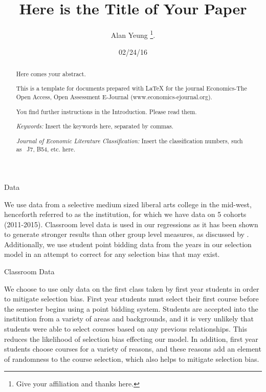 \documentclass[12pt,a4paper,english,fleqn]{article}
\date{02/24/16}
\makeatletter
\renewcommand\section{\@startsection{section}{1}{\z@}
{-5ex \@plus -1ex \@minus -.2ex}{2.3ex \@plus.2ex}{\normalfont\large\bf}}
\renewcommand\subsection{\@startsection{subsection}{2}
{\z@}{-3.25ex\@plus -1ex \@minus -.2ex}{1.5ex \@plus .2ex}{\normalfont\bf}}
\makeatother
\begin{document}
\title{Here is the Title of Your Paper}


\author{Alan Yeung%
\thanks{Give your affiliation and thanks here.%
}.}
\maketitle
\begin{abstract}
\noindent Here comes your abstract.

This is a template for documents prepared with \LaTeX{} for the journal
Economics-The Open Access, Open Assessment E-Journal (www.economics-ejournal.org).

You find further instructions in the Introduction. Please read them.

\noindent \medskip{}


\noindent \emph{Keywords: }Insert the keywords here, separated by
commas.

\noindent \emph{Journal of Economic Literature Classification: }Insert
the classification numbers, such as \ J7, B54,\emph{ }etc. here\emph{.}
\end{abstract}
\newpage{}

\doublespacing

\section{Data}

We use data from a selective medium sized liberal arts college in the mid-west, henceforth referred to as the institution, for which we have data on 5 cohorts (2011-2015). Classroom level data is used in our regressions as it has been shown to generate stronger results than other group level measures, as discussed by \citet{burke2013classroom}. Additionally, we use student point bidding data from the years in our selection model in an attempt to correct for any selection bias that may exist. 
\subsection{Classroom Data}

We choose to use only data on the first class taken by first year students in order to mitigate selection bias. First year students must select their first course before the semester begins using a point bidding system. Students are accepted into the institution from a variety of areas and backgrounds, and it is very unlikely that students were able to select courses based on any previous relationships. This reduces the likelihood of selection bias effecting our model. In addition, first year students choose courses for a variety of reasons, and these reasons add an element of randomness to the course selection, which also helps to mitigate selection bias. 
\end{document}

